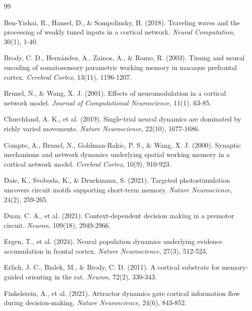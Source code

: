 \documentclass[11pt,a4paper]{article}
\begin{document}

\begin{thebibliography}{99}

Ben-Yishai, R., Hansel, D., \& Sompolinsky, H. (2018). Traveling waves and the processing of weakly tuned inputs in a cortical network. \textit{Neural Computation}, 30(1), 1-40.

Brody, C. D., Hernández, A., Zainos, A., \& Romo, R. (2003). Timing and neural encoding of somatosensory parametric working memory in macaque prefrontal cortex. \textit{Cerebral Cortex}, 13(11), 1196-1207.

Brunel, N., \& Wang, X. J. (2001). Effects of neuromodulation in a cortical network model. \textit{Journal of Computational Neuroscience}, 11(1), 63-85.

Churchland, A. K., et al. (2019). Single-trial neural dynamics are dominated by richly varied movements. \textit{Nature Neuroscience}, 22(10), 1677-1686.

Compte, A., Brunel, N., Goldman-Rakic, P. S., \& Wang, X. J. (2000). Synaptic mechanisms and network dynamics underlying spatial working memory in a cortical network model. \textit{Cerebral Cortex}, 10(9), 910-923.

Daie, K., Svoboda, K., \& Druckmann, S. (2021). Targeted photostimulation uncovers circuit motifs supporting short-term memory. \textit{Nature Neuroscience}, 24(2), 259-265.

Duan, C. A., et al. (2021). Context-dependent decision making in a premotor circuit. \textit{Neuron}, 109(18), 2949-2966.

Ergen, T., et al. (2024). Neural population dynamics underlying evidence accumulation in frontal cortex. \textit{Nature Neuroscience}, 27(3), 512-523.

Erlich, J. C., Bialek, M., \& Brody, C. D. (2011). A cortical substrate for memory-guided orienting in the rat. \textit{Neuron}, 72(2), 330-343.

Finkelstein, A., et al. (2021). Attractor dynamics gate cortical information flow during decision-making. \textit{Nature Neuroscience}, 24(6), 843-852.


\end{thebibliography}
\end{document}
